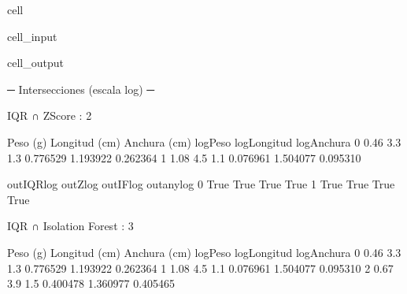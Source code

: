 \documentclass[a4paper,10pt,spanish]{jupyterBook}
\begin{document}
\begin{sphinxuseclass}{cell}
\begin{sphinxVerbatimInput}
\begin{sphinxuseclass}{cell_input}
\begin{sphinxVerbatim}[commandchars=\\\{\}]
\PYG{p}{[}\PYG{p}{]}
\PYG{p}{[}\PYG{p}{[}\PYG{p}{]}\PYG{p}{]}
\end{sphinxVerbatim}

\end{sphinxuseclass}\end{sphinxVerbatimInput}
\begin{sphinxVerbatimOutput}

\begin{sphinxuseclass}{cell_output}
\begin{sphinxVerbatim}[commandchars=\\\{\}]
─ Intersecciones (escala log) ─

IQR ∩ Z\PYGZhy{}Score              : 2
\end{sphinxVerbatim}

\begin{sphinxVerbatim}[commandchars=\\\{\}]
   Peso (g)  Longitud (cm)  Anchura (cm)  log\PYGZus{}Peso  log\PYGZus{}Longitud  log\PYGZus{}Anchura  \PYGZbs{}
0      0.46            3.3           1.3 \PYGZhy{}0.776529      1.193922     0.262364
1      1.08            4.5           1.1  0.076961      1.504077     0.095310

   out\PYGZus{}IQR\PYGZus{}log  out\PYGZus{}Z\PYGZus{}log  out\PYGZus{}IF\PYGZus{}log  out\PYGZus{}any\PYGZus{}log
0         True       True        True         True
1         True       True        True         True
\end{sphinxVerbatim}

\begin{sphinxVerbatim}[commandchars=\\\{\}]
IQR ∩ Isolation Forest     : 3
\end{sphinxVerbatim}

\begin{sphinxVerbatim}[commandchars=\\\{\}]
   Peso (g)  Longitud (cm)  Anchura (cm)  log\PYGZus{}Peso  log\PYGZus{}Longitud  log\PYGZus{}Anchura  \PYGZbs{}
0      0.46            3.3           1.3 \PYGZhy{}0.776529      1.193922     0.262364
1      1.08            4.5           1.1  0.076961      1.504077     0.095310
2      0.67            3.9           1.5 \PYGZhy{}0.400478      1.360977     0.405465


\end{sphinxVerbatim}
\end{sphinxuseclass}
\end{sphinxVerbatimOutput}
\end{sphinxuseclass}
\end{document}
